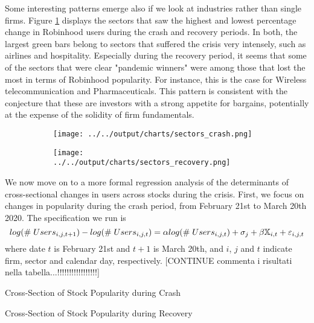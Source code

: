 \documentclass[12pt]{article}
\numberwithin{equation}{section} %
\begin{document}
Some interesting patterns emerge also if we look at industries rather than single firms. Figure \ref{chart-sectors} displays the sectors that saw the highest and lowest percentage change in Robinhood users during the crash and recovery periods. In both, the largest green bars belong to sectors that suffered the crisis very intensely, such as airlines and hospitality. Especially during the recovery period, it seems that some of the sectors that were clear "pandemic winners" were among those that lost the most in terms of Robinhood popularity. For instance, this is the case for Wireless telecommunication and Pharmaceuticals. This pattern is consistent with the conjecture that these are investors with a strong appetite for bargains, potentially at the expense of the solidity of firm fundamentals.

\begin{figure}
\centering
\caption{Test}
\begin{subfigure}{.8\textwidth}
\centering
\texttt{[image: ../../output/charts/sectors\_crash.png]} 
\end{subfigure} 
\begin{subfigure}{.8\textwidth}
\centering
\texttt{[image: ../../output/charts/sectors\_recovery.png]}
\end{subfigure}
\label{chart-sectors}
\end{figure}

We now move on to a more formal regression analysis of the determinants of cross-sectional changes in users across stocks during the crisis. First, we focus on changes in popularity during the crash period, from February 21st to March 20th 2020.
The specification we run is 
$$
log(\# \hspace{1mm} Users_{i,j,t+1})-log(\# \hspace{1mm} Users_{i,j,t}) = \alpha log(\# \hspace{1mm} Users_{i,j,t}) + \sigma_j + \beta \mathbb{X}_{i,t} + \varepsilon_{i,j,t}
$$
where date $t$ is February 21st and $t+1$ is March 20th, and $i$, $j$ and $t$ indicate firm, sector and calendar day, respectively.
[CONTINUE commenta i risultati nella tabella...!!!!!!!!!!!!!!!!!]

\begin{table} 
\caption{Cross-Section of Stock Popularity during Crash}
 \label{crashreg}
\end{table}


\begin{table} 
\caption{Cross-Section of Stock Popularity during Recovery}
 \label{crashreg}
\end{table}

% 
%
 
 
 \newpage


 
 
\end{document}
